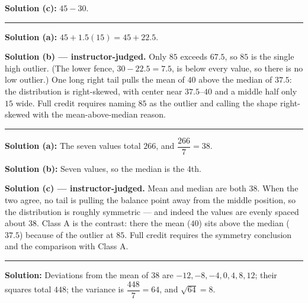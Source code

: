 \documentclass[12pt]{article}
\begin{document}
\textbf{Solution (c):} \quad $45 - 30$. 

\vspace{0.15cm}\noindent\rule{\linewidth}{0.2pt}\vspace{0.15cm}


\textbf{Solution (a):} \quad $45 + 1.5(15) = 45 + 22.5$. 

\textbf{Solution (b) --- instructor-judged.} \quad Only $85$ exceeds $67.5$, so $85$ is the
single high outlier. (The lower fence, $30 - 22.5 = 7.5$, is below every value, so there is no
low outlier.) One long right tail pulls the mean of $40$ above the median of $37.5$: the
distribution is right-skewed, with center near $37.5$--$40$ and a middle half only $15$ wide.
Full credit requires naming $85$ as the outlier and calling the shape right-skewed with the
mean-above-median reason.

\vspace{0.15cm}\noindent\rule{\linewidth}{0.2pt}\vspace{0.15cm}


\textbf{Solution (a):} \quad The seven values total $266$, and $\dfrac{266}{7} = 38$.

\textbf{Solution (b):} \quad Seven values, so the median is the 4th. 

\textbf{Solution (c) --- instructor-judged.} \quad Mean and median are both $38$. When the two
agree, no tail is pulling the balance point away from the middle position, so the distribution
is roughly symmetric --- and indeed the values are evenly spaced about $38$. Class A is the
contrast: there the mean ($40$) sits above the median ($37.5$) because of the outlier at $85$.
Full credit requires the symmetry conclusion and the comparison with Class A.

\vspace{0.15cm}\noindent\rule{\linewidth}{0.2pt}\vspace{0.15cm}


\textbf{Solution:} \quad Deviations from the mean of $38$ are
$-12, -8, -4, 0, 4, 8, 12$; their squares total $448$; the variance is
$\dfrac{448}{7} = 64$, and $\sqrt{64} = 8$. 
\end{document}
